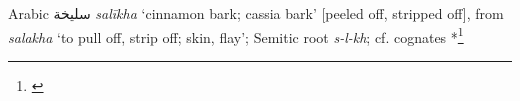 \begin{etymology}\label{ety:salikha}
Arabic {سليخة} \textit{salīkha} `cinnamon bark; cassia bark' [peeled off, stripped off], from \textit{salakha} `to pull off, strip off; skin, flay'; Semitic root \textit{s-l-kh}; cf. cognates *\footnote{\textcite[491]{wehr_dictionary_1976}}
\end{etymology}